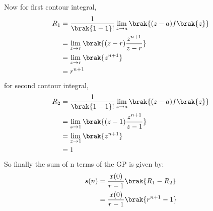 \begin{enumerate}[label=\thechapter.\arabic*,ref=\thechapter.\theenumi]
Now for first contour integral,
\begin{align}
R_1 &= \frac{1}{\brak {1-1}!}\lim\limits_{z\to a}\brak {{(z-a)}f\brak{z}} \\
    &= \lim\limits_{z\to r}\brak{(z-r) \frac{z^{n+1}}{z-r}} \\
    &= \lim\limits_{z\to r}\brak{z^{n+1}} \\
    &= r^{n+1} 
\end{align}
for second contour integral,
\begin{align}
R_2 &= \frac{1}{\brak {1-1}!}\lim\limits_{z\to a}\brak {{(z-a)}f\brak{z}} \\
    &= \lim\limits_{z\to 1}\brak{(z-1) \frac{z^{n+1}}{z-1}} \\
    &= \lim\limits_{z\to 1}\brak{z^{n+1}} \\
    &= 1
\end{align}
So finally the sum of n terms of the GP is given by:
\begin{align}
s(n) &= \frac{x(0)}{r-1}\brak{R_1-R_2} \\
     &= \frac{x(0)}{r-1}\brak{r^{n+1}-1}
\end{align}
\end{enumerate}
